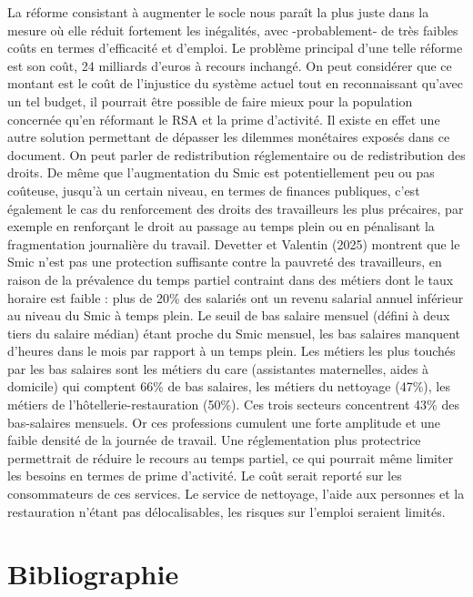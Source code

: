 \documentclass[
  french,
]{article}
\begin{document}
La réforme consistant à augmenter le socle nous paraît la plus juste
dans la mesure où elle réduit fortement les inégalités, avec
-probablement- de très faibles coûts en termes d'efficacité et d'emploi.
Le problème principal d'une telle réforme est son coût, 24 milliards
d'euros à recours inchangé. On peut considérer que ce montant est le
coût de l'injustice du système actuel tout en reconnaissant qu'avec un
tel budget, il pourrait être possible de faire mieux pour la population
concernée qu'en réformant le RSA et la prime d'activité. Il existe en
effet une autre solution permettant de dépasser les dilemmes monétaires
exposés dans ce document. On peut parler de redistribution réglementaire
ou de redistribution des droits. De même que l'augmentation du Smic est
potentiellement peu ou pas coûteuse, jusqu'à un certain niveau, en
termes de finances publiques, c'est également le cas du renforcement des
droits des travailleurs les plus précaires, par exemple en renforçant le
droit au passage au temps plein ou en pénalisant la fragmentation
journalière du travail. Devetter et Valentin (2025) montrent que le Smic
n'est pas une protection suffisante contre la pauvreté des travailleurs,
en raison de la prévalence du temps partiel contraint dans des métiers
dont le taux horaire est faible : plus de 20\% des salariés ont un
revenu salarial annuel inférieur au niveau du Smic à temps plein. Le
seuil de bas salaire mensuel (défini à deux tiers du salaire médian)
étant proche du Smic mensuel, les bas salaires manquent d'heures dans le
mois par rapport à un temps plein. Les métiers les plus touchés par les
bas salaires sont les métiers du care (assistantes maternelles, aides à
domicile) qui comptent 66\% de bas salaires, les métiers du nettoyage
(47\%), les métiers de l'hôtellerie-restauration (50\%). Ces trois
secteurs concentrent 43\% des bas-salaires mensuels. Or ces professions
cumulent une forte amplitude et une faible densité de la journée de
travail. Une réglementation plus protectrice permettrait de réduire le
recours au temps partiel, ce qui pourrait même limiter les besoins en
termes de prime d'activité. Le coût serait reporté sur les consommateurs
de ces services. Le service de nettoyage, l'aide aux personnes et la
restauration n'étant pas délocalisables, les risques sur l'emploi
seraient limités.

\section*{Bibliographie}\label{bibliographie}
\end{document}
